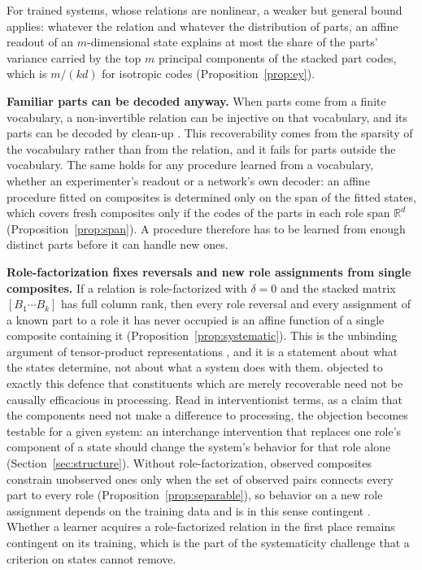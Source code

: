 \documentclass[10pt]{article}
\theoremstyle{plain}
\theoremstyle{remark}
\newcommand{\R}{\mathbb{R}}
\begin{document}
For trained systems, whose relations are nonlinear, a weaker but general bound applies: whatever the relation and whatever the distribution of parts, an affine readout of an $m$-dimensional state explains at most the share of the parts' variance carried by the top $m$ principal components of the stacked part codes, which is $m/(kd)$ for isotropic codes (Proposition~\ref{prop:ey}).

\textbf{Familiar parts can be decoded anyway.} When parts come from a finite vocabulary, a non-invertible relation can be injective on that vocabulary, and its parts can be decoded by clean-up \citep{plate1995,plate2003,frady2018}. This recoverability comes from the sparsity of the vocabulary rather than from the relation, and it fails for parts outside the vocabulary. The same holds for any procedure learned from a vocabulary, whether an experimenter's readout or a network's own decoder: an affine procedure fitted on composites is determined only on the span of the fitted states, which covers fresh composites only if the codes of the parts in each role span $\R^d$ (Proposition~\ref{prop:span}). A procedure therefore has to be learned from enough distinct parts before it can handle new ones.

\textbf{Role-factorization fixes reversals and new role assignments from single composites.} If a relation is role-factorized with $\delta = 0$ and the stacked matrix $[B_1 \cdots B_k]$ has full column rank, then every role reversal and every assignment of a known part to a role it has never occupied is an affine function of a single composite containing it (Proposition~\ref{prop:systematic}). This is the unbinding argument of tensor-product representations \citep{smolensky1990}, and it is a statement about what the states determine, not about what a system does with them. \citet{fodor1990} objected to exactly this defence that constituents which are merely recoverable need not be causally efficacious in processing. Read in interventionist terms, as a claim that the components need not make a difference to processing, the objection becomes testable for a given system: an interchange intervention that replaces one role's component of a state should change the system's behavior for that role alone (Section~\ref{sec:structure}). Without role-factorization, observed composites constrain unobserved ones only when the set of observed pairs connects every part to every role (Proposition~\ref{prop:separable}), so behavior on a new role assignment depends on the training data and is in this sense contingent \citep{aizawa2003}. Whether a learner acquires a role-factorized relation in the first place remains contingent on its training, which is the part of the systematicity challenge that a criterion on states cannot remove.
\end{document}
